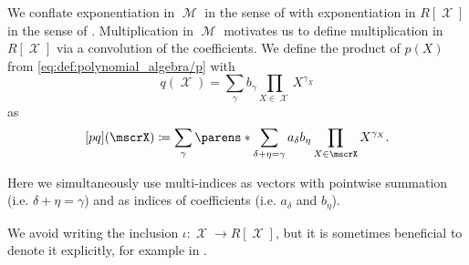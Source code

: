 \begin{definition}
\begin{thmenum}
     We conflate exponentiation in \( \mscrM \) in the sense of  with exponentiation in \( R[\mscrX] \) in the sense of . Multiplication in \( \mscrM \) motivates us to define multiplication in \( R[\mscrX] \) via a convolution of the coefficients. We define the product of \( p(X) \) from \eqref{eq:def:polynomial_algebra/p} with
    \begin{equation}\label{eq:def:polynomial_algebra/q}
      q(\mscrX) = \sum_\gamma b_\gamma \prod_{X \in \mscrX} X^{\gamma_X}
    \end{equation}
    as
    \begin{equation}\label{eq:def:polynomial_algebra/pq}
      [pq](\mscrX) \coloneqq \sum_\gamma \parens*{ \sum_{\delta + \eta = \gamma} a_\delta b_\eta } \prod_{X \in \mscrX} X^{\gamma_X}.
    \end{equation}

    Here we simultaneously use multi-indices as vectors with pointwise summation (i.e. \( \delta + \eta = \gamma \)) and as indices of coefficients (i.e. \( a_\delta \) and \( b_\eta \)).

     We avoid writing the inclusion \( \iota: \mscrX \to R[\mscrX] \), but it is sometimes beneficial to denote it explicitly, for example in .
  \end{thmenum}
\end{definition}

